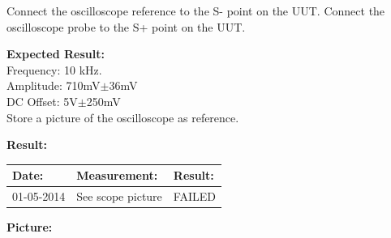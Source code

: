 Connect the oscilloscope reference to the S- point on the UUT.
Connect the oscilloscope probe to the S+ point on the UUT.


\begin{figure}[H]
	\centering
\end{figure}

\textbf{Expected Result:}\\
Frequency: 10 kHz.\\
Amplitude: 710mV$\pm$36mV\\
DC Offset: 5V$\pm$250mV\\
Store a picture of the oscilloscope as reference.


\textbf{Result:}
\begin{table}[H]
	\centering
	\begin{tabular}{|p{2cm}|p{3cm}|p{2cm}|}\hline
		\textbf{Date:} & \textbf{Measurement:} & \textbf{Result:} \\ \hline
	 	01-05-2014 & See scope picture & FAILED \\ \hline
	\end{tabular}
\end{table}
\textbf{Picture:}

